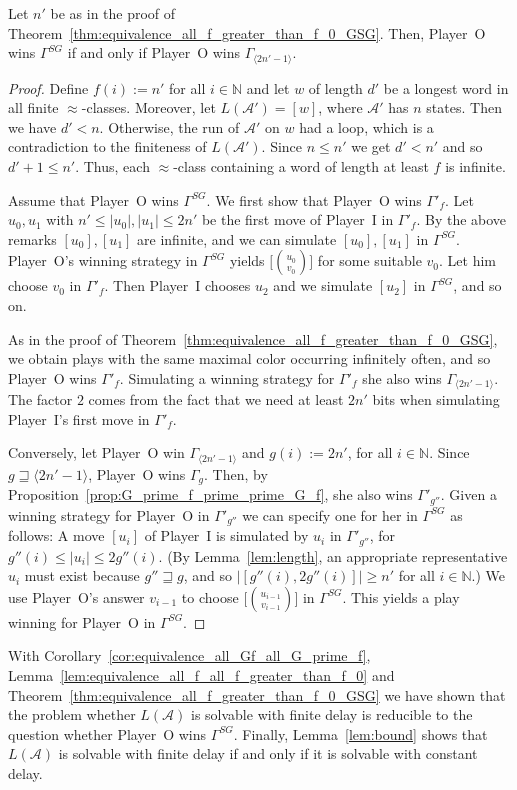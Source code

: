 \documentclass[fleqn,envcountsame]{LMCS}
\newcommand{\aut}[1]{\ensuremath{\mathcal{#1}}}
\newcommand{\pI}{Player~I\xspace}
\newcommand{\pO}{Player~O\xspace}
\newcommand{\GSG}{\ensuremath{\Gamma^{SG}}\xspace}
\newcommand{\Gd}[1]{\ensuremath{\Gamma_{#1}}\xspace}
\newcommand{\Gp}[1]{\ensuremath{\Gamma'_{#1}}\xspace}
\newcommand{\LA}{\ensuremath{L(\aut{A})}\xspace}
\newcommand{\const}[1]{\ensuremath{\langle#1\rangle}\xspace}
\newcommand{\Nat}{\ensuremath{\mathbb{N}}\xspace}
\let\obinom\binom
\renewcommand\binom[2]{
  \Big( { {{#1}} \atop {{#2}} } \Big)
}
\begin{document}
\begin{lem}\label{lem:bound}
Let $n'$ be as in the proof of Theorem~\ref{thm:equivalence_all_f_greater_than_f_0_GSG}.
Then, \pO wins \GSG if and only if \pO wins \Gd{\const{2n'-1}}.
\end{lem}

\begin{proof}
Define $f(i):=n'$ for all $i\in\Nat$ and let $w$ of length $d'$ be a longest word in all
finite $\approx$-classes. Moreover, let $L(\aut{A}')=[w]$, where $\aut{A}'$ has $n$ states.
Then we have $d'<n$. Otherwise, the run of $\aut{A}'$ on $w$ had a loop,
which is a contradiction to the finiteness of $L(\aut{A}')$.
Since $n\leq n'$ we get $d'<n'$ and so $d'+1\leq n'$.
Thus, each $\approx$-class containing a word of length at least $f$ is infinite.

Assume that \pO wins \GSG. We first show that \pO wins \Gp{f}.
Let $u_0,u_1$ with $n'\leq|u_0|,|u_1|\leq2n'$ be the first move of \pI in
\Gp{f}. By the above remarks $[u_0],[u_1]$ are infinite, and we can
simulate $[u_0],[u_1]$ in \GSG. \pO's winning strategy in \GSG yields
$\big[\obinom{u_0}{v_0}\big]$ for some suitable $v_0$. Let him choose
$v_0$ in \Gp{f}. Then \pI chooses $u_2$ and we simulate $[u_2]$ in
\GSG, and so on.

As in the proof of Theorem~\ref{thm:equivalence_all_f_greater_than_f_0_GSG},
we obtain plays with the same maximal color occurring infinitely often, and so
\pO wins \Gp{f}. Simulating a winning strategy for \Gp{f} she also wins
\Gd{\const{2n'-1}}. The factor $2$ comes from the fact that we need at least
$2n'$ bits when simulating \pI's first move in \Gp{f}.

Conversely, let \pO win \Gd{\const{2n'-1}} and $g(i):=2n'$, for all
$i\in\Nat$. Since $g\sqsupseteq\const{2n'-1}$, \pO wins \Gd{g}.
Then, by Proposition~\ref{prop:G_prime_f_prime_prime_G_f},
she also wins \Gp{g''}. Given a winning strategy for \pO in \Gp{g''}
we can specify one for her in \GSG as follows: A move $[u_i]$ of \pI is
simulated by $u_i$ in \Gp{g''}, for $g''(i)\leq|u_i|\leq2g''(i)$.
(By Lemma~\ref{lem:length}, an appropriate representative $u_i$ must exist
because $g''\sqsupseteq g$, and so $|[g''(i),2g''(i)]|\geq n'$ for all
$i\in\Nat$.) We use \pO's answer $v_{i-1}$ to choose
$\big[\obinom{u_{i-1}}{v_{i-1}}\big]$ in \GSG.
This yields a play winning for \pO in \GSG.
\end{proof}

With Corollary~\ref{cor:equivalence_all_Gf_all_G_prime_f}, Lemma~\ref{lem:equivalence_all_f_all_f_greater_than_f_0}
and Theorem~\ref{thm:equivalence_all_f_greater_than_f_0_GSG} we have shown that the problem whether
\LA is solvable with finite delay is reducible to the question whether
\pO wins \GSG. Finally, Lemma~\ref{lem:bound} shows that
\LA is solvable with finite delay if and only if it is solvable with constant delay.
\end{document}

